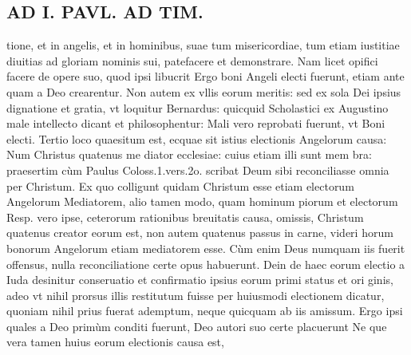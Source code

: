 \documentclass{article}
\begin{document}
\begin{pages}
\section*{AD I. PAVL. AD TIM. }
\marginpar{[ p.334 ]}\pstart tione, et in angelis, et in hominibus, suae tum misericordiae, tum etiam iustitiae diuitias ad gloriam nominis sui, patefacere et demonstrare. Nam licet opifici facere de opere suo, quod ipsi libucrit Ergo boni Angeli electi fuerunt, etiam ante quam a Deo crearentur. Non autem ex vllis eorum meritis: sed ex sola Dei ipsius dignatione et gratia, vt loquitur Bernardus: quicquid Scholastici ex Augustino male intellecto dicant et philosophentur: Mali vero reprobati fuerunt, vt Boni electi.  \pend\pstart Tertio loco quaesitum est, ecquae sit istius electionis Angelorum causa: Num Christus quatenus me diator ecclesiae: cuius etiam illi sunt mem bra: praesertim cùm Paulus Coloss.1.vers.2o. scribat Deum sibi reconciliasse omnia per Christum. Ex quo colligunt quidam Christum esse etiam electorum Angelorum Mediatorem, alio tamen modo, quam hominum piorum et electorum Resp. vero ipse, ceterorum rationibus breuitatis causa, omissis, Christum quatenus creator eorum est, non autem quatenus passus in carne, videri horum bonorum Angelorum etiam mediatorem esse. Cùm enim Deus numquam iis fuerit offensus, nulla reconciliatione certe opus habuerunt. Dein de haec eorum electio a Iuda desinitur conseruatio et confirmatio ipsius eorum primi status et ori ginis, adeo vt nihil prorsus illis restitutum fuisse per huiusmodi electionem dicatur, quoniam nihil prius fuerat ademptum, neque quicquam ab iis amissum. Ergo ipsi quales a Deo primùm conditi fuerunt, Deo autori suo certe placuerunt Ne que vera tamen huius eorum electionis causa est,  \pend

\end{pages}
\end{document}
